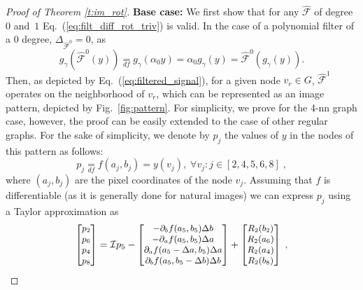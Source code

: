 \documentclass[10pt,journal,compsoc]{IEEEtran}
\newcommand{\df}{\mathop{=}\limits_{df}}
\newcommand{\hmF}{\hat{\mathcal{F}}}
\begin{document}
\begin{proof}[Proof of Theorem \ref{t:im_rot}]
		\textbf{Base case:} We first show that for any $\hmF$ of degree $0$ and~$1$ Eq.~(\ref{eq:filt_diff_rot_triv}) is valid. In the case of a polynomial filter of a $0$ degree, $\Delta_{\hmF^0}  = 0$, as
		\begin{equation}
		g_\gamma\left(\hmF^0 (y)\right) \df g_\gamma(\alpha_0 y) = \alpha_0 g_\gamma(y) = \hmF^0 (g_\gamma(y)).
		\label{eq:filt_diff_rot_zero_deg}
		\end{equation}
		\noindent
		Then, as depicted by Eq.~(\ref{eq:filtered_signal}), for a given node $v_r \in G$, $\hmF^1$ operates on the neighborhood of $v_r$, which can be represented as an image pattern, depicted by Fig.~\ref{fig:pattern}. For simplicity, we prove for the 4-nn graph case, however, the proof can be easily extended to the case of other regular graphs.
		For the sake of simplicity, we denote by $p_j$ the values of $y$ in the nodes of this pattern as follows:
		\begin{equation}
		p_j \df f(a_j,b_j) = y(v_j), \; \forall v_j: j \in [2,4,5,6,8] \;,
		\end{equation}
		\noindent
		where $(a_j, b_j)$ are the pixel coordinates of the node $v_j$. Assuming that $f$ is differentiable (as it is generally done for natural images) we can express $p_j$ using a Taylor approximation as
		\begin{equation}
		\small
		\begin{bmatrix}
		p_2 \\ p_6 \\ p_4 \\ p_8 \\
		\end{bmatrix} = 
		\mathcal{I} p_5 - 
		\begin{bmatrix}
		- \partial_b f(a_5, b_5) \Delta b \\
		- \partial_a f(a_5, b_5) \Delta a \\
		\partial_a f(a_5 - \Delta a, b_5) \Delta a\\
		\partial_b f(a_5, b_5- \Delta b)  \Delta b\\
		\end{bmatrix} +
		\begin{bmatrix}
		R_2(b_2) \\ R_2(a_6) \\ R_2(a_4) \\ R_2(b_8) \\
		\end{bmatrix} \;,
		\label{eq:points_o}
		\end{equation}

\end{proof}
\end{document}
